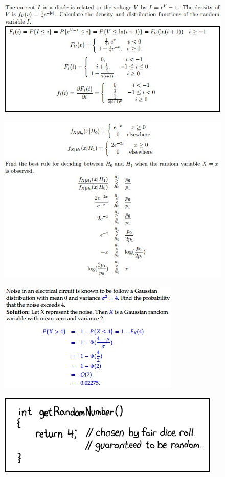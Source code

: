 \documentclass[11pt,landscape]{article}
\begin{document}
\begin{multicols}{3}
\setlength{\premulticols}{1pt}
\setlength{\postmulticols}{1pt}
\setlength{\multicolsep}{1pt}
\setlength{\columnsep}{2pt}
\begin{figure}[H]
    \includegraphics[scale=0.53]{./Images/2/DenDisSolve.jpg}
\end{figure}
\begin{figure}[H]
    \includegraphics[scale=0.53]{./Images/2/Decision.jpg}
\end{figure}
\begin{figure}[H]
    \includegraphics[scale=0.95]{./Images/2/qfunc.jpg}
\end{figure}
\begin{figure}[H]
    \includegraphics[scale=0.75]{./Images/1/RandNumXKCD.jpg}
\end{figure}
\end{multicols}
\end{document}
